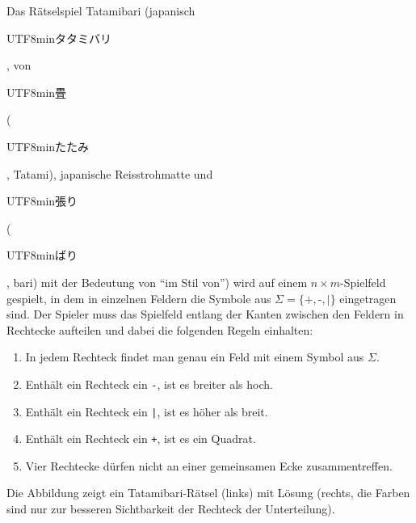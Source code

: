 Das Rätselspiel Tatamibari (japanisch
\begin{CJK}{UTF8}{min}タタミバリ\end{CJK}, von
\begin{CJK}{UTF8}{min}畳\end{CJK}
(\begin{CJK}{UTF8}{min}たたみ\end{CJK}, Tatami), japanische Reisstrohmatte
und \begin{CJK}{UTF8}{min}張り\end{CJK}
(\begin{CJK}{UTF8}{min}ばり\end{CJK}, bari)
mit der Bedeutung von ``im Stil von'')
wird auf einem $n\times m$-Spielfeld gespielt, in dem in einzelnen Feldern
die Symbole aus $\Sigma=\{\texttt{+}, \texttt{-}, \texttt{|}\}$ eingetragen
sind.
Der Spieler muss das Spielfeld entlang der Kanten zwischen den Feldern
in Rechtecke aufteilen und dabei die folgenden Regeln einhalten:
\begin{enumerate}
\item
In jedem Rechteck findet man genau ein Feld mit einem Symbol aus $\Sigma$.
\item
Enthält ein Rechteck ein \texttt{-}, ist es breiter als hoch.
\item
Enthält ein Rechteck ein \texttt{|}, ist es höher als breit.
\item
Enthält ein Rechteck ein \texttt{+}, ist es ein Quadrat.
\item
Vier Rechtecke dürfen nicht an einer gemeinsamen Ecke zusammentreffen.
\end{enumerate}
Die Abbildung zeigt ein Tatamibari-Rätsel (links) mit Lösung (rechts, die
Farben sind nur zur besseren Sichtbarkeit der Rechteck der Unterteilung).
